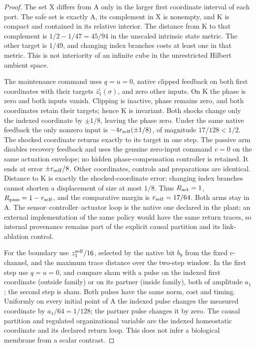 \documentclass[11pt,a4paper]{article}
\theoremstyle{definition}
\begin{document}
\begin{proof}
The set X differs from A only in the larger first coordinate interval of each port.
The safe set is exactly A, its complement in X is nonempty, and K is compact
and contained in its relative interior. The distance from K to that complement
is $1/2-1/47=45/94$ in the unscaled intrinsic state metric. The other target
is $1/49$, and changing index branches costs at least one in that metric.
This is not
interiority of an infinite cube in the unrestricted Hilbert ambient space.

The maintenance command uses $q=u=0$, native clipped feedback on both first
coordinates with their targets $\bar z_1^i(\sigma)$, and zero other inputs.
On K the phase is zero and both inputs vanish. Clipping is inactive, phase
remains zero, and both coordinates retain their targets; hence K is invariant.
Both shocks change only the indexed coordinate by $\pm1/8$, leaving the phase
zero. Under the same native feedback the only nonzero input is
$-4r_{\rm self}(\pm1/8)$, of magnitude $17/128<1/2$. The shocked coordinate
returns exactly to its target in one step. The passive arm disables recovery
feedback and uses the genuine zero-input command $v=0$ on the same actuation
envelope; no hidden phase-compensation controller is retained. It ends at error
$\pm r_{\rm self}/8$. Other coordinates, controls and preparations are identical.
Distance to K is exactly the shocked-coordinate error: changing index branches
cannot shorten a displacement of size at most $1/8$. Thus
$R_{\rm act}=1$, $R_{\rm pass}=1-r_{\rm self}$, and the comparative margin is
$r_{\rm self}=17/64$. Both arms stay in A. The sensor--controller--actuator loop is
the native one declared in the plant; an external implementation of the same
policy would have the same return traces, so internal provenance remains part
of the explicit causal partition and its link-ablation control.

For the boundary use $z_1^{\rm self}/16$, selected by the native bit $b_9$
from the fixed c-channel, and
the maximum trace distance over the two-step window. In the first step use
$q=u=0$, and compare sham with a pulse on the indexed first coordinate
(outside family) or on its partner (inside family), both of amplitude $a_1$;
the second step is sham. Both pulses have the same norm, cost and timing.
Uniformly on every initial point of A the indexed
pulse changes the measured coordinate by $a_1/64=1/128$; the partner pulse
changes it by zero. The causal partition and regulated organizational variable
are the indexed homeostatic coordinate and its declared return loop. This does
not infer a biological membrane from a scalar contrast.


\end{proof}
\end{document}
